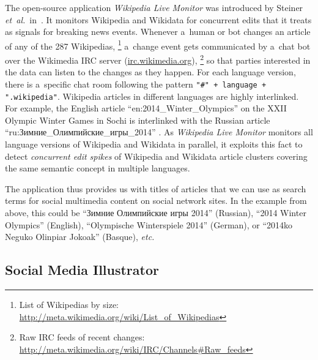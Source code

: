 \documentclass{sig-alternate}
\newcommand{\inlinelistingsize}{\fontsize{8pt}{11pt}}
\let\oldurl\url
\renewcommand{\url}[1]{\inlinelistingsize\oldurl{#1}}
\begin{document}
The open-source application \emph{Wikipedia Live Monitor}
was introduced by Steiner \emph{et~al.}\
in~\cite{steiner2013mjnomore}.
It monitors Wikipedia and Wikidata for concurrent edits
that it treats as signals for breaking news events.
Whenever a~human or bot changes an article
of any of the 287 Wikipedias,%
\footnote{List of Wikipedias by size:
\url{http://meta.wikimedia.org/wiki/List_of_Wikipedias}}
a~change event gets communicated by a~chat bot
over the Wikimedia IRC server (\url{irc.wikimedia.org}),%
\footnote{Raw IRC feeds of recent changes:
\url{http://meta.wikimedia.org/wiki/IRC/Channels\#Raw_feeds}}
so that parties interested in the data
can listen to the changes as they happen.
For each language version, there is
a~specific chat room following the pattern
\texttt{"\#" + language + ".wikipedia"}.
Wikipedia articles in different languages are highly interlinked.
For example, the English article
``en:2014\_Winter\_Olympics''
on the XXII Olympic Winter Games in Sochi
is interlinked with the Russian article
\selectfont%
``ru:Зимние\_Олимпийские\_игры\_2014''%
\selectfont.
As \emph{Wikipedia Live Monitor} monitors all language versions
of Wikipedia and Wikidata in parallel,
it exploits this fact to detect \emph{concurrent edit spikes}
of Wikipedia and Wikidata article clusters covering
the same semantic concept in multiple languages.

The application thus provides us with titles of articles
that we can use as search terms for social multimedia content
on social network sites.
In the example from above, this could be
\selectfont%
``Зимние Олимпийские игры 2014''%
\selectfont (Russian),
``2014 Winter Olympics'' (English),
``Olympische Winterspiele 2014'' (German),
or ``2014ko Neguko Olinpiar Jokoak'' (Basque), \emph{etc.}

\subsection{Social Media Illustrator}
\end{document}
